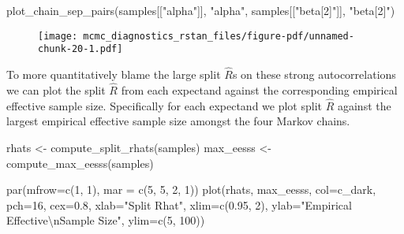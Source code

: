 \documentclass[
  letterpaper,
  DIV=11,
  numbers=noendperiod]{scrartcl}
\newenvironment{Shaded}{\begin{snugshade}}{\end{snugshade}}
\newcommand{\AttributeTok}[1]{\textcolor[rgb]{0.40,0.45,0.13}{#1}}
\newcommand{\DecValTok}[1]{\textcolor[rgb]{0.68,0.00,0.00}{#1}}
\newcommand{\FloatTok}[1]{\textcolor[rgb]{0.68,0.00,0.00}{#1}}
\newcommand{\FunctionTok}[1]{\textcolor[rgb]{0.28,0.35,0.67}{#1}}
\newcommand{\NormalTok}[1]{\textcolor[rgb]{0.00,0.23,0.31}{#1}}
\newcommand{\OtherTok}[1]{\textcolor[rgb]{0.00,0.23,0.31}{#1}}
\newcommand{\SpecialCharTok}[1]{\textcolor[rgb]{0.37,0.37,0.37}{#1}}
\newcommand{\StringTok}[1]{\textcolor[rgb]{0.13,0.47,0.30}{#1}}
\begin{document}
\begin{Shaded}
\begin{Highlighting}[]
\FunctionTok{plot\_chain\_sep\_pairs}\NormalTok{(samples[[}\StringTok{"alpha"}\NormalTok{]], }\StringTok{"alpha"}\NormalTok{, }
\NormalTok{                     samples[[}\StringTok{"beta[2]"}\NormalTok{]], }\StringTok{"beta[2]"}\NormalTok{)}
\end{Highlighting}
\end{Shaded}

\begin{figure}[H]

{\centering \texttt{[image: mcmc\_diagnostics\_rstan\_files/figure-pdf/unnamed-chunk-20-1.pdf]}

}

\end{figure}

To more quantitatively blame the large split \(\hat{R}\)s on these
strong autocorrelations we can plot the split \(\hat{R}\) from each
expectand against the corresponding empirical effective sample size.
Specifically for each expectand we plot split \(\hat{R}\) against the
largest empirical effective sample size amongst the four Markov chains.

\begin{Shaded}
\begin{Highlighting}[]
\NormalTok{rhats }\OtherTok{\textless{}{-}} \FunctionTok{compute\_split\_rhats}\NormalTok{(samples)}
\NormalTok{max\_eesss }\OtherTok{\textless{}{-}} \FunctionTok{compute\_max\_eesss}\NormalTok{(samples)}

\FunctionTok{par}\NormalTok{(}\AttributeTok{mfrow=}\FunctionTok{c}\NormalTok{(}\DecValTok{1}\NormalTok{, }\DecValTok{1}\NormalTok{), }\AttributeTok{mar =} \FunctionTok{c}\NormalTok{(}\DecValTok{5}\NormalTok{, }\DecValTok{5}\NormalTok{, }\DecValTok{2}\NormalTok{, }\DecValTok{1}\NormalTok{))}
\FunctionTok{plot}\NormalTok{(rhats, max\_eesss,}
     \AttributeTok{col=}\NormalTok{c\_dark, }\AttributeTok{pch=}\DecValTok{16}\NormalTok{, }\AttributeTok{cex=}\FloatTok{0.8}\NormalTok{,}
     \AttributeTok{xlab=}\StringTok{"Split Rhat"}\NormalTok{, }\AttributeTok{xlim=}\FunctionTok{c}\NormalTok{(}\FloatTok{0.95}\NormalTok{, }\DecValTok{2}\NormalTok{),}
     \AttributeTok{ylab=}\StringTok{"Empirical Effective}\SpecialCharTok{\textbackslash{}n}\StringTok{Sample Size"}\NormalTok{, }\AttributeTok{ylim=}\FunctionTok{c}\NormalTok{(}\DecValTok{5}\NormalTok{, }\DecValTok{100}\NormalTok{))}
\end{Highlighting}
\end{Shaded}
\end{document}

